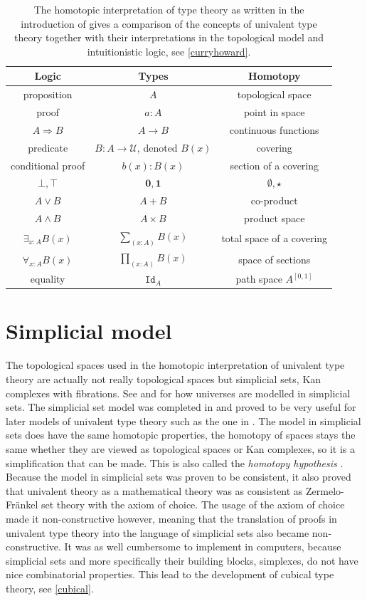 \documentclass[12pt,a4paper,twoside,xetex]{book} %
\newcommand{\keyword}[1]{\emph{#1}\index{#1}}
\newcommand{\op}[1]{\mathtt{#1}}
\begin{document}
\begin{table}\label{tab:The-homotopic-interpretation}
\centering
\begin{tabular}{|c|c|c|}
\hline 
\textbf{Logic} & \textbf{Types} & \textbf{Homotopy}\tabularnewline
\hline 
proposition & $A$  & topological space\tabularnewline
proof & $a:A$ & point in space\tabularnewline 
$A\Rightarrow B$ & $A\rightarrow B$ & continuous functions\tabularnewline
predicate & $B:A\rightarrow\mathcal{U}$, denoted $B\left(x\right)$ & 
covering\tabularnewline
conditional proof & $b\left(x\right):B\left(x\right)$ & section of a 
covering\tabularnewline 
$\bot,\top$ & $\boldsymbol{0},\boldsymbol{1}$ & $\emptyset,\star$\tabularnewline
$A\vee B$ & $A+B$ & co-product\tabularnewline
$A\wedge B$ & $A\times B$ & product space\tabularnewline
$\exists_{x:A}B\left(x\right)$ & $\sum_{\left(x:A\right)}B\left(x\right)$ & 
total space of a covering\tabularnewline
$\forall_{x:A}B\left(x\right)$ & $\prod_{\left(x:A\right)}B\left(x\right)$ & 
space of sections\tabularnewline
 equality & $\op{Id}_{A}$ & path space $A^{[0,1]}$\tabularnewline
\hline 
\end{tabular}
\caption{The homotopic interpretation of type theory as written in the 
introduction of \cite{Voevodsky2013} gives a comparison of the concepts of 
univalent type theory together with their interpretations in the topological 
model and intuitionistic logic, see \cref{curryhoward}.}
\end{table}




\section{Simplicial model}\label{simpmod}

The topological spaces used in the homotopic interpretation of univalent type 
theory are actually not really topological spaces but simplicial 
sets, Kan complexes with fibrations. See \cite{Streicher2006} and 
\cite{Voevodsky2009} for how universes are modelled in simplicial sets. The 
simplicial set model was completed in \cite{Kapulkin2012} and proved to be very 
useful for later models of univalent type theory such as the one in 
\cite{Cohen2016}. The model in simplicial sets does have the same 
homotopic properties, the homotopy of spaces stays the same whether they are viewed 
as topological spaces or Kan complexes, so it is a simplification that can be 
made. This is also called the \keyword{homotopy hypothesis} 
\cite{Schreiber2018a}. Because the model in simplicial sets was proven to be 
consistent, it also proved that univalent theory as a mathematical theory was as 
consistent as Zermelo-Fr\"ankel set theory with the axiom of choice. The usage 
of the axiom of choice made it non-constructive however, meaning that the 
translation of proofs in univalent type theory into the language of simplicial 
sets also became non-constructive. It was as well cumbersome to implement in 
computers, because simplicial sets and more specifically their building blocks, 
simplexes, do not have nice combinatorial properties. This lead to the 
development of cubical type theory, see \cref{cubical}.
\end{document}
